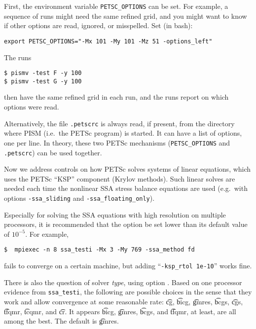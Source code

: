 First, the environment variable \texttt{PETSC_OPTIONS} can be set.  For example, a sequence of runs might need the same refined grid, and you might want to know if other options are read, ignored, or misspelled.  Set (in bash):

\texttt{export PETSC_OPTIONS="-Mx 101 -My 101 -Mz 51 -options_left"}

\noindent The runs 
\begin{verbatim}
$ pismv -test F -y 100
$ pismv -test G -y 100
\end{verbatim}
\noindent then have the same refined grid in each run, and the runs report on which options were read.

Alternatively, the file \texttt{.petscrc} is always read, if present, from the directory where PISM (i.e.~the PETSc program) is started.  It can have a list of options, one per line.   In theory, these two PETSc mechanisms (\verb|PETSC_OPTIONS| and \verb|.petscrc|) can be used together.


Now we address controls on how PETSc solves systems of linear equations, which uses the PETSc ``KSP'' component (Krylov methods).  Such linear solves are needed each time the nonlinear SSA stress balance equations are used (e.g.~with options \texttt{-ssa_sliding} and \texttt{-ssa_floating_only}).

Especially for solving the SSA equations with high resolution on multiple processors, it is recommended that the option  be set lower than its default value of $10^{-5}$.  For example, 

\begin{verbatim}
$  mpiexec -n 8 ssa_testi -Mx 3 -My 769 -ssa_method fd
\end{verbatim}

\noindent fails to converge on a certain machine, but adding ``\verb|-ksp_rtol 1e-10|'' works fine.

There is also the question of solver \emph{type}, using option .  Based on one processor evidence from \texttt{ssa_testi}, the following are possible choices in the sense that they work and allow convergence at some reasonable rate: \t{cg}, \t{bicg}, \t{gmres}, \t{bcgs}, \t{cgs}, \t{tfqmr}, \t{tcqmr}, and \t{cr}.  It appears \t{bicg}, \t{gmres}, \t{bcgs}, and \t{tfqmr}, at least, are all among the best.  The default is \t{gmres}.

